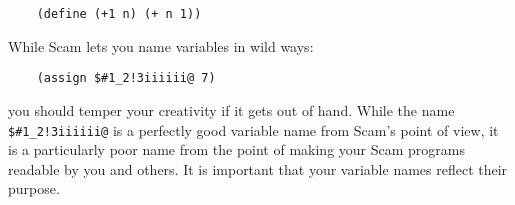 \begin{verbatim}
    (define (+1 n) (+ n 1))
\end{verbatim}

While Scam lets you name variables in wild ways:

\begin{verbatim}
    (assign $#1_2!3iiiiii@ 7)
\end{verbatim}

you should temper your
creativity if it gets out of hand.
While the name \verb-$#1_2!3iiiiii@-
is a perfectly good variable name from Scam's point of
view,
it is a particularly poor name from the point of making your Scam
programs readable by you and others.
It is important that your variable
names reflect their purpose.


